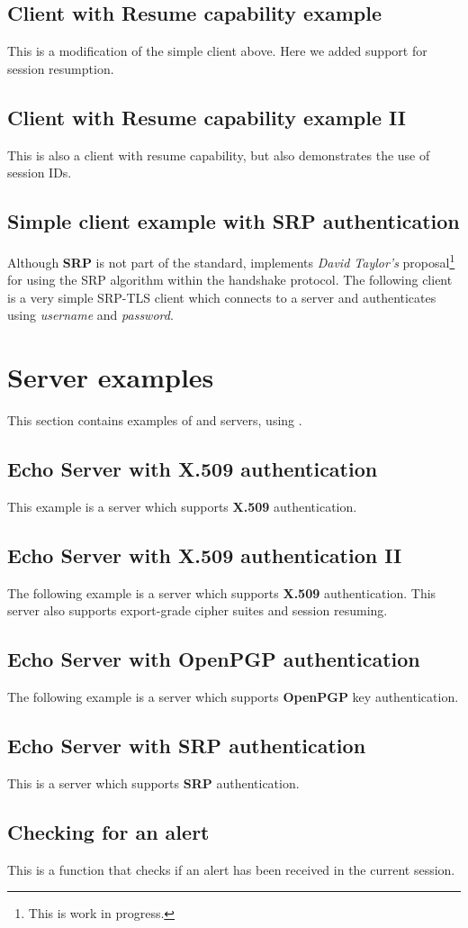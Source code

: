 \subsection{Client with Resume capability example}
\label{resume-example}
This is a modification of the simple client above. Here we added support 
for session resumption.


\subsection{Client with Resume capability example II}
\label{resume-example2}
This is also a client with resume capability, but also demonstrates
the use of session IDs.


\subsection{Simple client example with SRP authentication}
Although {\bf SRP} is not part of the \tls{} standard, \gnutls{} implements
{\it David Taylor's} proposal\footnote{This is work in progress.}  for using the SRP algorithm
within the \tls{} handshake protocol. The following client
is a very simple SRP-TLS client which connects to a server 
and authenticates using {\it username} and {\it password}.



\section{Server examples}
This section contains examples of \tls{} and \ssl{} servers, using \gnutls{}.

\subsection{Echo Server with X.509 authentication}
This example is a server which supports {\bf X.509} authentication.


\subsection{Echo Server with X.509 authentication II}
The following example is a server which supports {\bf X.509} authentication.
This server also supports export-grade cipher suites and session resuming.


\subsection{Echo Server with OpenPGP authentication}
The following example is a server which supports {\bf OpenPGP} key authentication.


\subsection{Echo Server with SRP authentication}
This is a server which supports {\bf SRP} authentication.


\subsection{Checking for an alert}
This is a function that checks if an alert has been received
in the current session.




